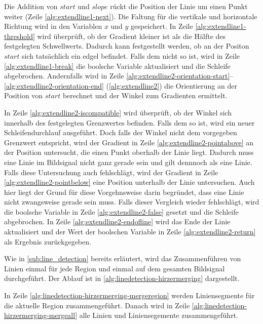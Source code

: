 Die Addition von $\mathit{start}$ und $\mathit{slope}$ rückt die Position der Linie um einen Punkt weiter (Zeile
 \ref{alg:extendline1-next}). Die Faltung für die vertikale und horizontale Richtung wird in den Variablen $x$ und $y$
 gespeichert. In Zeile \ref{alg:extendline1-threshold} wird überprüft, ob der Gradient kleiner ist als die Hälfte des
 festgelegten Schwellwerts. Dadurch kann festgestellt werden, ob an der Positon $\mathit{start}$ sich tatsächlich ein
 \gls{edgel} befindet. Falls dem nicht so ist, wird in Zeile \ref{alg:extendline1-break} die boolsche Variable
 aktualisiert und die Schleife abgebrochen. Andernfalls wird in Zeile
 \ref{alg:extendline2-orientation-start}--\ref{alg:extendline2-orientation-end} (\autoref{alg:extendline2}) die
 Orientierung an der Position von $\mathit{start}$ berechnet und der Winkel zum Gradienten ermittelt.



In Zeile \ref{alg:extendline2-iscompatible} wird überprüft, ob der Winkel sich innerhalb des festgelegten Grenzwertes
 befinden. Falls dem so ist, wird ein neuer Schleifendurchlauf ausgeführt. Doch falls der Winkel nicht dem vorgegeben
 Grenzwert entspricht, wird der Gradient in Zeile \ref{alg:extendline2-pointabove} an der Position untersucht, die
 einen Punkt oberhalb der Linie liegt. Dadurch muss eine Linie im Bildsignal nicht ganz gerade sein und gilt dennnoch
 als eine Linie. Falls diese Untersuchung auch fehlschlägt, wird der Gradient in Zeile \ref{alg:extendline2-pointbelow}
 eine Position unterhalb der Linie untersuchen. Auch hier liegt der Grund für diese Vorgehnsweise darin begründet, dass
 eine Linie nicht zwangsweise gerade sein muss. Falls dieser Vergleich wieder fehlschlägt, wird die boolsche Variable
 in Zeile \ref{alg:extendline2-false} gesetzt und die Schleife abgebrochen. In Zeile
 \ref{alg:extendline2-endofline} wird das Ende der Linie aktualisiert und der Wert der boolschen Variable in Zeile
 \ref{alg:extendline2-return} als Ergebnis zurückgegeben.

Wie in \autoref{sub:line_detection} bereits erläutert, wird das Zusammenführen von Linien einmal für jede Region und
 einmal auf dem gesamten Bildsignal durchgeführt. Der Ablauf ist in \autoref{alg:linedetection-hirzermerging}
 dargestellt.



In Zeile \ref{alg:linedetection-hirzermerging-mergeregion} werden Liniensegmente für die aktuelle Region
 zusammengeführt. Danach wird in Zeile \ref{alg:linedetection-hirzermerging-mergeall} alle Linien und Liniensegemente zusammengeführt.
